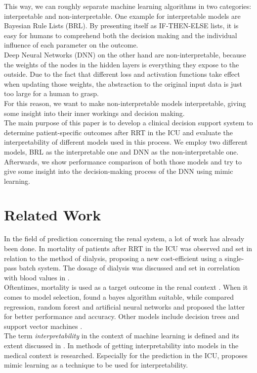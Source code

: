 \documentclass[conference,compsoc]{IEEEtran}
\begin{document}
This way, we can roughly separate machine learning algorithms in two categories: interpretable and non-interpretable. 
One example for interpretable models are Bayesian Rule Lists (BRL).
By presenting itself as IF-THEN-ELSE lists, it is easy for humans to comprehend both the decision making and the individual influence of each parameter on the outcome. \\
Deep Neural Networks (DNN) on the other hand are non-interpretable, because the weights of the nodes in the hidden layers is everything they expose to the outside.
Due to the fact that different loss and activation functions take effect when updating those weights, the abstraction to the original input data is just too large for a human to grasp. \\
For this reason, we want to make non-interpretable models interpretable, giving some insight into their inner workings and decision making. \\

The main purpose of this paper is to develop a clinical decision support system to determine patient-specific outcomes after RRT in the ICU and evaluate the interpretability of different models used in this process. 
We employ two different models, BRL as the interpretable one and DNN as the non-interpretable one.
Afterwards, we show performance comparison of both those models and try to give some insight into the decision-making process of the DNN using mimic learning.


\section{Related Work}
In the field of prediction concerning the renal system, a lot of work has already been done.
In \cite{Schwenger2012} mortality of patients after RRT in the ICU was observed and set in relation to the method of dialysis, proposing a new cost-efficient using a single-pass batch system. The dosage of dialysis was discussed and set in correlation with blood values in \cite{Ricci2006}. \\
Oftentimes, mortality is used as a target outcome in the renal context \cite{Barrett1997} \cite{Lakshmi2014} \cite{Kusiak2005}.
When it comes to model selection, \cite{Baby2015} found a bayes algorithm suitable, while \cite{Lakshmi2014} compared regression, random forest and artificial neural networks and proposed the latter for better performance and accuracy. Other models include decision trees \cite{Greco2010} and support vector machines \cite{Vijayarani2015} \cite{Sinha2015}. \\
The term \emph{interpretability} in the context of machine learning is defined and its extent discussed in \cite{Lipton2016}. In \cite{Katuwal2016} methods of getting interpretability into models in the medical context is researched. Especially for the prediction in the ICU, \cite{Che2016} proposes mimic learning as a technique to be used for interpretability. \\
\end{document}
